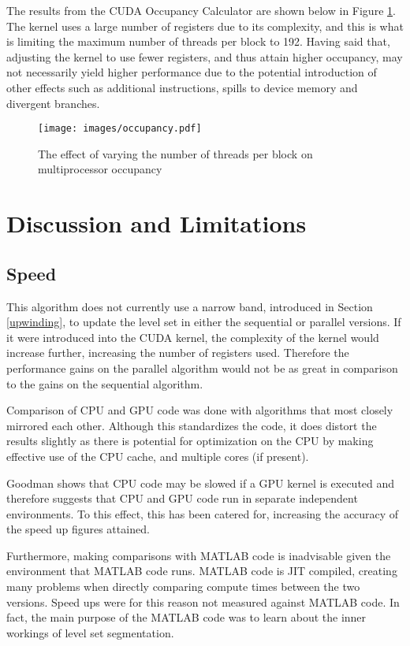 The results from the CUDA Occupancy Calculator are shown below in Figure \ref{fig:occupancy}. The kernel uses a large number of registers due to its complexity, and this is what is limiting the maximum number of threads per block to 192. Having said that, adjusting the kernel to use fewer registers, and thus attain higher occupancy, may not necessarily yield higher performance due to the potential introduction of other effects such as additional instructions, spills to device memory and divergent branches.

\begin{figure}
	\centering
		\texttt{[image: images/occupancy.pdf]}
	\caption{The effect of varying the number of threads per block on multiprocessor occupancy}
	\label{fig:occupancy}
\end{figure}


\section{Discussion and Limitations}

\subsection{Speed}
This algorithm does not currently use a narrow band, introduced in Section \ref{upwinding}, to update the level set in either the sequential or parallel versions. If it were introduced into the CUDA kernel, the complexity of the kernel would increase further, increasing the number of registers used. Therefore the performance gains on the parallel algorithm would not be as great in comparison to the gains on the sequential algorithm.

Comparison of CPU and GPU code was done with algorithms that most closely mirrored each other. Although this standardizes the code, it does distort the results slightly as there is potential for optimization on the CPU by making effective use of the CPU cache, and multiple cores (if present). 

Goodman \cite{goodman} shows that CPU code may be slowed if a GPU kernel is executed and therefore suggests that CPU and GPU code run in separate independent environments. To this effect, this has been catered for, increasing the accuracy of the speed up figures attained.

Furthermore, making comparisons with MATLAB code is inadvisable given the environment that MATLAB code runs. MATLAB code is JIT compiled, creating many problems when directly comparing compute times between the two versions. Speed ups were for this reason not measured against MATLAB code. In fact, the main purpose of the MATLAB code was to learn about the inner workings of level set segmentation.


